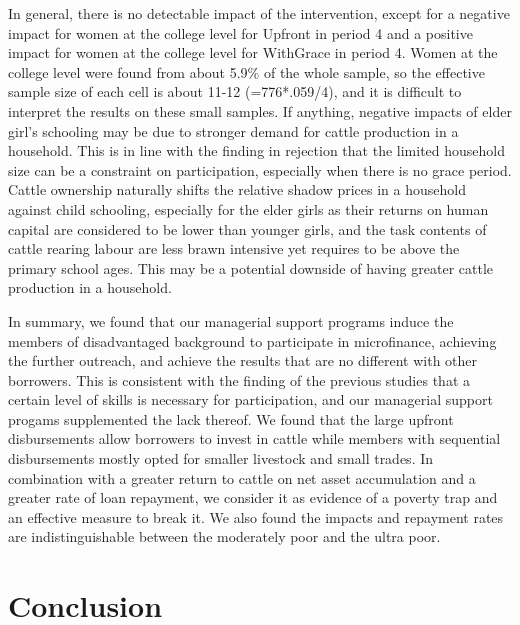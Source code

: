 	In general, there is no detectable impact of the intervention, except for a negative impact for women at the college level for \textsf{Upfront} in period 4 and a positive impact for women at the college level for \textsf{WithGrace} in period 4. Women at the college level were found from about 5.9\% of the whole sample, so the effective sample size of each cell is about 11-12 (=776*.059/4), and it is difficult to interpret the results on these small samples. If anything, negative impacts of elder girl's schooling may be due to stronger demand for cattle production in a household. This is in line with the finding in rejection that the limited household size can be a constraint on participation, especially when there is no grace period. Cattle ownership naturally shifts the relative shadow prices in a household against child schooling, especially for the elder girls as their returns on human capital are considered to be lower than younger girls, and the task contents of cattle rearing labour are less brawn intensive yet requires to be above the primary school ages. This may be a potential downside of having greater cattle production in a household.

	In summary, we found that our managerial support programs induce the members of disadvantaged background to participate in microfinance, achieving the further outreach, and achieve the results that are no different with other borrowers. This is consistent with the finding of the previous studies that a certain level of skills is necessary for participation, and our managerial support progams supplemented the lack thereof. 	We found that the large upfront disbursements allow borrowers to invest in cattle while members with sequential disbursements mostly opted for smaller livestock and small trades. In combination with a greater return to cattle on net asset accumulation and a greater rate of loan repayment, we consider it as evidence of a poverty trap and an effective measure to break it. We also found the impacts and repayment rates are indistinguishable between the moderately poor and the ultra poor.




\section{Conclusion}
\label{SecConclusion}

